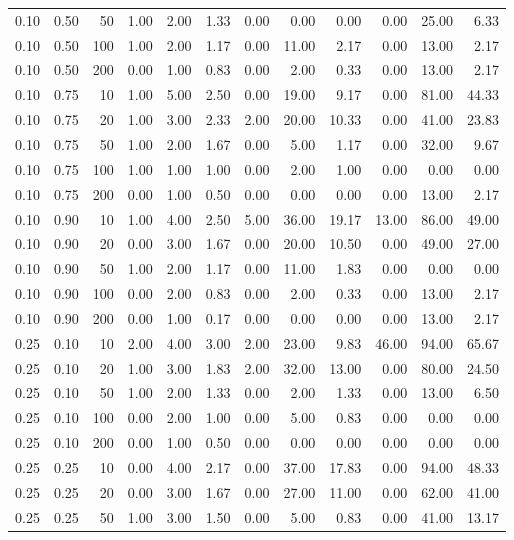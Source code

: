 \documentclass{bmstu}
\begin{document}
\begin{longtable}{|r|r|r|r|r|r|r|r|r|r|r|r|}
0.10 & 0.50 & 50 & 1.00 & 2.00 & 1.33 & 0.00 & 0.00 & 0.00 & 0.00 & 25.00 & 6.33  \\
0.10 & 0.50 & 100 & 1.00 & 2.00 & 1.17 & 0.00 & 11.00 & 2.17 & 0.00 & 13.00 & 2.17  \\
0.10 & 0.50 & 200 & 0.00 & 1.00 & 0.83 & 0.00 & 2.00 & 0.33 & 0.00 & 13.00 & 2.17  \\
\hline
0.10 & 0.75 & 10 & 1.00 & 5.00 & 2.50 & 0.00 & 19.00 & 9.17 & 0.00 & 81.00 & 44.33  \\
0.10 & 0.75 & 20 & 1.00 & 3.00 & 2.33 & 2.00 & 20.00 & 10.33 & 0.00 & 41.00 & 23.83  \\
0.10 & 0.75 & 50 & 1.00 & 2.00 & 1.67 & 0.00 & 5.00 & 1.17 & 0.00 & 32.00 & 9.67  \\
0.10 & 0.75 & 100 & 1.00 & 1.00 & 1.00 & 0.00 & 2.00 & 1.00 & 0.00 & 0.00 & 0.00  \\
0.10 & 0.75 & 200 & 0.00 & 1.00 & 0.50 & 0.00 & 0.00 & 0.00 & 0.00 & 13.00 & 2.17  \\
\hline
0.10 & 0.90 & 10 & 1.00 & 4.00 & 2.50 & 5.00 & 36.00 & 19.17 & 13.00 & 86.00 & 49.00  \\
0.10 & 0.90 & 20 & 0.00 & 3.00 & 1.67 & 0.00 & 20.00 & 10.50 & 0.00 & 49.00 & 27.00  \\
0.10 & 0.90 & 50 & 1.00 & 2.00 & 1.17 & 0.00 & 11.00 & 1.83 & 0.00 & 0.00 & 0.00  \\
0.10 & 0.90 & 100 & 0.00 & 2.00 & 0.83 & 0.00 & 2.00 & 0.33 & 0.00 & 13.00 & 2.17  \\
0.10 & 0.90 & 200 & 0.00 & 1.00 & 0.17 & 0.00 & 0.00 & 0.00 & 0.00 & 13.00 & 2.17  \\
\hline
0.25 & 0.10 & 10 & 2.00 & 4.00 & 3.00 & 2.00 & 23.00 & 9.83 & 46.00 & 94.00 & 65.67  \\
0.25 & 0.10 & 20 & 1.00 & 3.00 & 1.83 & 2.00 & 32.00 & 13.00 & 0.00 & 80.00 & 24.50  \\
0.25 & 0.10 & 50 & 1.00 & 2.00 & 1.33 & 0.00 & 2.00 & 1.33 & 0.00 & 13.00 & 6.50  \\
0.25 & 0.10 & 100 & 0.00 & 2.00 & 1.00 & 0.00 & 5.00 & 0.83 & 0.00 & 0.00 & 0.00  \\
0.25 & 0.10 & 200 & 0.00 & 1.00 & 0.50 & 0.00 & 0.00 & 0.00 & 0.00 & 0.00 & 0.00  \\
\hline
0.25 & 0.25 & 10 & 0.00 & 4.00 & 2.17 & 0.00 & 37.00 & 17.83 & 0.00 & 94.00 & 48.33  \\
0.25 & 0.25 & 20 & 0.00 & 3.00 & 1.67 & 0.00 & 27.00 & 11.00 & 0.00 & 62.00 & 41.00  \\
0.25 & 0.25 & 50 & 1.00 & 3.00 & 1.50 & 0.00 & 5.00 & 0.83 & 0.00 & 41.00 & 13.17  \\

\end{longtable}
\end{document}
